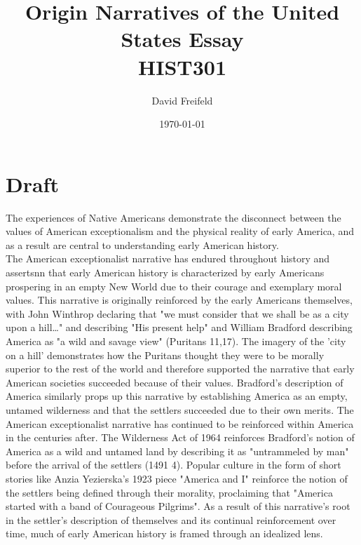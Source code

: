 \documentclass[letterpaper]{article}
\author{David Freifeld}
\date{\today}
\title{Origin Narratives of the United States Essay\\\medskip
\large HIST301}
\renewcommand\maketitle{}
\begin{document}
\maketitle

\section{Draft}
\label{sec:org3715593}
The experiences of Native Americans demonstrate the disconnect between the values of American exceptionalism and the physical reality of early America, and as a result are central to understanding early American history.\\

The American exceptionalist narrative has endured throughout history and assertsnn that early American history is characterized by early Americans prospering in an empty New World due to their courage and exemplary moral values. This narrative is originally reinforced by the early Americans themselves, with John Winthrop declaring that "we must consider that we shall be as a city upon a hill\ldots{}" and describing "His present help" and William Bradford describing America as "a wild and savage view" (Puritans 11,17). The imagery of the 'city on a hill' demonstrates how the Puritans thought they were to be morally superior to the rest of the world and therefore supported the narrative that early American societies succeeded because of their values. Bradford's description of America similarly props up this narrative by establishing America as an empty, untamed wilderness and that the settlers succeeded due to their own merits. The American exceptionalist narrative has continued to be reinforced within America in the centuries after. The Wilderness Act of 1964 reinforces Bradford's notion of America as a wild and untamed land by describing it as "untrammeled by man" before the arrival of the settlers (1491 4). Popular culture in the form of short stories like Anzia Yezierska's 1923 piece "America and I" reinforce the notion of the settlers being defined through their morality, proclaiming that "America started with a band of Courageous Pilgrims". As a result of this narrative's root in the settler's description of themselves and its continual reinforcement over time, much of early American history is framed through an idealized lens.\\
\end{document}
